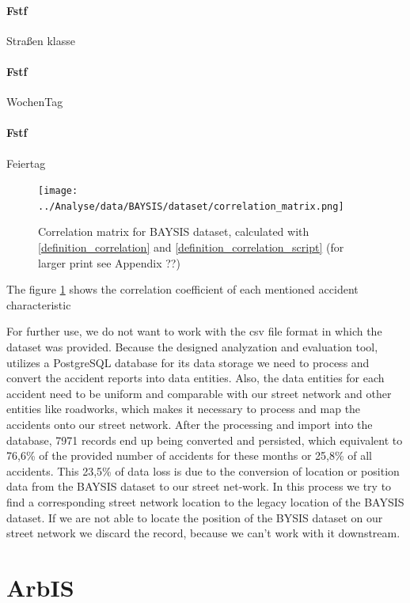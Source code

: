 \documentclass[a4paper,12pt]{report}
\begin{document}
\paragraph{Fstf}
Straßen klasse

\paragraph{Fstf}
WochenTag

\paragraph{Fstf}
Feiertag

\begin{figure}[H]
	\centering
	\texttt{[image: ../Analyse/data/BAYSIS/dataset/correlation\_matrix.png]}
	\caption{Correlation matrix for BAYSIS dataset, calculated with \ref{definition_correlation} and \ref{definition_correlation_script} (for larger print see Appendix ??)}
	\label{img:correlation_matrix_dataset}
\end{figure}

The figure \ref{img:correlation_matrix_dataset} shows the correlation coefficient of each mentioned accident characteristic 

For further use, we do not want to work with the \acrshort{csv} file format in which the dataset was provided. Because the designed analyzation and evaluation tool, utilizes a PostgreSQL database for its data storage we need to process and convert the accident reports into data entities. Also, the data entities for each accident need to be uniform and comparable with our street network and other entities like roadworks, which makes it necessary to process and map the accidents onto our street network. After the processing and import into the database, 7971 records end up being converted and persisted, which equivalent to 76,6\% of the provided number of accidents for these months or 25,8\% of all accidents. This 23,5\% of data loss is due to the conversion of location or position data from the BAYSIS dataset to our street net-work. In this process we try to find a corresponding street network location to the legacy location of the BAYSIS dataset. If we are not able to locate the position of the BYSIS dataset on our street network we discard the record, because we can’t work with it downstream. 

\section{ArbIS}
\label{dataset_arbis}
\end{document}
